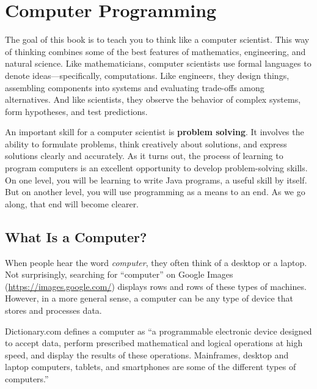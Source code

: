 \chapter{Computer Programming}
\label{computer-programming}

The goal of this book is to teach you to think like a computer scientist.
This way of thinking combines some of the best features of mathematics, engineering, and natural science.
Like mathematicians, computer scientists use formal languages to denote ideas---specifically, computations.
Like engineers, they design things, assembling components into systems and evaluating trade-offs among alternatives.
And like scientists, they observe the behavior of complex systems, form hypotheses, and test predictions.


An important skill for a computer scientist is {\bf problem solving}.
It involves the ability to formulate problems, think creatively about solutions, and express solutions clearly and accurately.
As it turns out, the process of learning to program computers is an excellent opportunity to develop problem-solving skills.
On one level, you will be learning to write Java programs, a useful skill by itself.
But on another level, you will use programming as a means to an end.
As we go along, that end will become clearer.


\section{What Is a Computer?}
\label{computer-programming_what-is-a-computer}

When people hear the word {\em computer}, they often think of a desktop or a laptop.
Not surprisingly, searching for ``computer'' on Google Images (\url{https://images.google.com/}) displays rows and rows of these types of machines.
However, in a more general sense, a computer can be any type of device that stores and processes data.

Dictionary.com defines a computer as ``a programmable electronic device designed to accept data, perform prescribed mathematical and logical operations at high speed, and display the results of these operations.
Mainframes, desktop and laptop computers, tablets, and smartphones are some of the different types of computers.''


